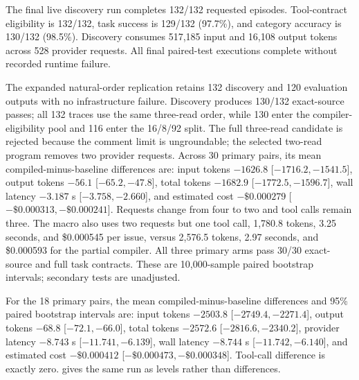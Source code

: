 The final live discovery run completes 132/132 requested episodes.  Tool-contract
eligibility is 132/132, task success is 129/132 (97.7\%), and category accuracy is
130/132 (98.5\%).  Discovery consumes 517,185 input and 16,108 output tokens across 528
provider requests.  All final paired-test executions complete without recorded runtime
failure.

The expanded natural-order replication retains 132 discovery and 120 evaluation outputs
with no infrastructure failure.  Discovery produces 130/132 exact-source passes; all 132
traces use the same three-read order, while 130 enter the compiler-eligibility pool and 116
enter the 16/8/92 split.  The full three-read candidate is rejected because the comment
limit is ungroundable; the selected two-read program removes two provider requests.
Across 30 primary pairs, its mean compiled-minus-baseline differences are: input tokens
$-1626.8$ [$-1716.2,-1541.5$], output tokens $-56.1$ [$-65.2,-47.8$], total tokens
$-1682.9$ [$-1772.5,-1596.7$], wall latency $-3.187$ s [$-3.758,-2.660$], and estimated
cost $-\$0.000279$ [$-\$0.000313,-\$0.000241$].  Requests change from four to two and
tool calls remain three.  The macro also uses two requests but one tool call, 1,780.8
tokens, 3.25 seconds, and \$0.000545 per issue, versus 2,576.5 tokens, 2.97 seconds, and
\$0.000593 for the partial compiler.  All three primary arms pass 30/30 exact-source and
full task contracts.  These are 10,000-sample paired bootstrap intervals; secondary tests
are unadjusted.

\begin{table}[t]
  \centering
  \caption{Per-metric absolute means for the prescribed-prefix ablation, the numeric
  backing of \cref{fig:live-efficiency,fig:paired-test}.  $p_{\mathrm{W}}$ is a paired
  two-sided Wilcoxon test over the 18 pairs; it is reported for the endpoints that vary,
  and the request reduction is marked deterministic because it is exactly $4\to1$ in every
  pair.  Secondary tests are unadjusted.}
  \label{tab:live-results}
  \small
  
\end{table}

For the 18 primary pairs, the mean compiled-minus-baseline differences and 95\% paired
bootstrap intervals are: input tokens $-2503.8$ [$-2749.4,-2271.4$], output tokens
$-68.8$ [$-72.1,-66.0$], total tokens $-2572.6$ [$-2816.6,-2340.2$], provider latency
$-8.743$ s [$-11.741,-6.139$], wall latency $-8.744$ s [$-11.742,-6.140$], and estimated
cost $-\$0.000412$ [$-\$0.000473,-\$0.000348$].  Tool-call difference is exactly zero.
 gives the same run as levels rather than differences.

